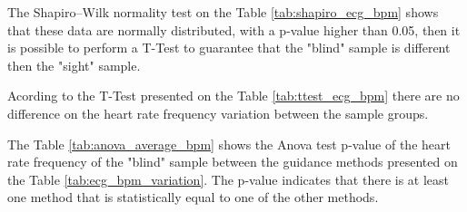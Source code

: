 
%
%    
%
%
%
%
%    
%
The Shapiro–Wilk normality test on the Table \ref{tab:shapiro_ecg_bpm} shows that these data are normally distributed, with a p-value higher than 0.05, then it is possible to perform a T-Test to guarantee that the "blind" sample is different then the "sight" sample.

%

Acording to the T-Test presented on the Table \ref{tab:ttest_ecg_bpm} there are no difference on the heart rate frequency variation between the sample groups.

%

\begin{table}[!htb]
    \begin{minipage}{.45\linewidth}
        
    \end{minipage}
    \hfill
    \begin{minipage}{.45\linewidth}
        \vspace{-2.75cm}
        
    \end{minipage}
\end{table}

The Table \ref{tab:anova_average_bpm} shows the Anova test p-value of the heart rate frequency of the "blind" sample between the guidance methods presented on the Table \ref{tab:ecg_bpm_variation}. The p-value indicates that there is at least one method that is statistically equal to one of the other methods.

